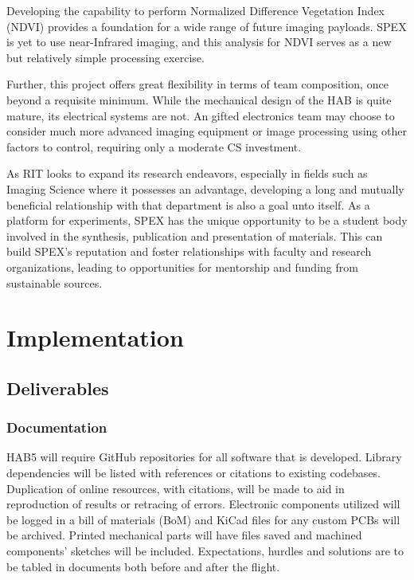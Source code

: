 \documentclass[conference]{IEEEtran} %
\begin{document}
Developing the capability to perform Normalized Difference Vegetation Index (NDVI) provides a foundation for a wide range of future imaging payloads. 
SPEX is yet to use near-Infrared imaging, and this analysis for NDVI serves as a new but relatively simple processing exercise.

Further, this project offers great flexibility in terms of team composition, once beyond a requisite minimum.
While the mechanical design of the HAB is quite mature, its electrical systems are not.
An gifted electronics team may choose to consider much more advanced imaging equipment or image processing using other factors to control, requiring only a moderate CS investment. 

As RIT looks to expand its research endeavors, especially in fields such as Imaging Science where it possesses an advantage, developing a long and mutually beneficial relationship with that department is also a goal unto itself. 
As a platform for experiments, SPEX has the unique opportunity to be a student body involved in the synthesis, publication and presentation of materials. 
This can build SPEX's reputation and foster relationships with faculty and research organizations, leading to opportunities for mentorship and funding from sustainable sources.

\section{Implementation}
\label{implementation}
\subsection{Deliverables}
\label{deliverables}
\subsubsection{Documentation}
\label{deliverables-documentation}
 HAB5 will require GitHub repositories for all software that is developed. Library dependencies will be listed with references or citations to existing codebases. Duplication of online resources, with citations, will be made to aid in reproduction of results or retracing of errors.  
 Electronic components utilized will be logged in a bill of materials (BoM) and KiCad files for any custom PCBs will be archived. 
 Printed mechanical parts will have files saved and machined components' sketches will be included. 
 Expectations, hurdles and solutions are to be tabled in documents both before and after the flight.
\end{document}
